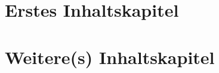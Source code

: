 %
%
% 
%
%
%
%
%






%
%



%
%

\frontmatter
\setcounter{secnumdepth}{3}

\tableofcontents

%
%

\mainmatter

\glsresetall

\glsresetall

\chapter{Erstes Inhaltskapitel}
\chapter{Weitere(s) Inhaltskapitel}
%
\glsresetall


%
%




